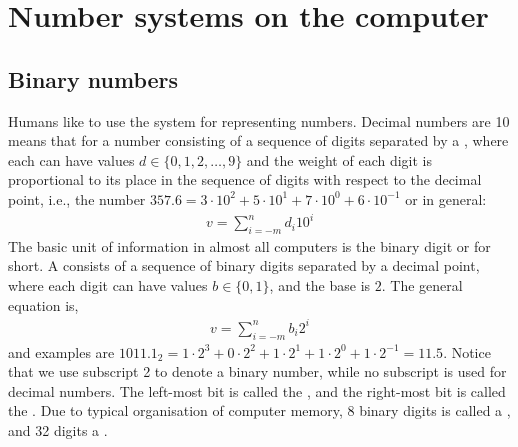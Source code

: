 \chapter{Number systems on the computer}
\label{app:numbers}
\section{Binary numbers}
\label{sec:binary}
Humans like to use the  system for representing numbers. Decimal numbers are  10 means that for a number consisting of a sequence of digits separated by a , where each  can have values $d \in \{0,1,2,\ldots,9\}$ and the weight of each digit is proportional to its place in the sequence of digits with respect to the decimal point, i.e., the number $357.6=3\cdot 10^2+5\cdot 10^1+7\cdot 10^0+6\cdot 10^{-1}$ or in general:
\begin{align}
  v = \sum_{i=-m}^nd_i10^i
\end{align}
The basic unit of information in almost all computers is the binary digit or  for short. A  consists of a sequence of binary digits separated by a decimal point, where each digit can have values $b \in \{0,1\}$, and the base is $2$. The general equation is,
\begin{align}
  v = \sum_{i=-m}^nb_i2^i
\end{align}
and examples are $1011.1_2 = 1\cdot 2^3+0\cdot 2^2+1\cdot 2^1+1\cdot 2^0+1\cdot 2^{-1} = 11.5$. Notice that we use subscript 2 to denote a binary number, while no subscript is used for decimal numbers. The left-most bit is called the , and the right-most bit is called the . Due to typical organisation of computer memory, 8 binary digits is called a , and 32 digits a .

